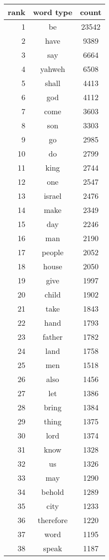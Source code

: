 \begin{figure*}
  \begin{tiny}
  \begin{centering}
  \begin{tabular}{|r|c|c|}
    \hline
    rank & word type & count \\
    \hline
1 & be & 23542 \\
2 & have & 9389 \\
3 & say & 6664 \\
4 & yahweh & 6508 \\
5 & shall & 4413 \\
6 & god & 4112 \\
7 & come & 3603 \\
8 & son & 3303 \\
9 & go & 2985 \\
10 & do & 2799 \\
11 & king & 2744 \\
12 & one & 2547 \\
13 & israel & 2476 \\
14 & make & 2349 \\
15 & day & 2246 \\
16 & man & 2190 \\
17 & people & 2052 \\
18 & house & 2050 \\
19 & give & 1997 \\
20 & child & 1902 \\
21 & take & 1843 \\
22 & hand & 1793 \\
23 & father & 1782 \\
24 & land & 1758 \\
25 & men & 1518 \\
26 & also & 1456 \\
27 & let & 1386 \\
28 & bring & 1384 \\
29 & thing & 1375 \\
30 & lord & 1374 \\
31 & know & 1328 \\
32 & us & 1326 \\
33 & may & 1290 \\
34 & behold & 1289 \\
35 & city & 1233 \\
36 & therefore & 1220 \\
37 & word & 1195 \\
38 & speak & 1187 \\

\end{tabular}
\end{centering}
\end{tiny}
\end{figure*}
